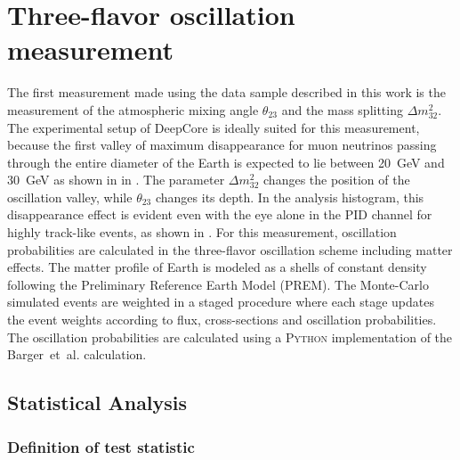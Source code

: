 \chapter{Three-flavor oscillation measurement}
\setchapterpreamble[u]{\margintoc}

The first measurement made using the data sample described in this work is the measurement of the atmospheric mixing angle $\theta_{23}$ and the mass splitting $\Delta m^2_{32}$. The experimental setup of DeepCore is ideally suited for this measurement, because the first valley of maximum disappearance for muon neutrinos passing through the entire diameter of the Earth is expected to lie between 20~GeV and 30~GeV as shown in  in . The parameter $\Delta m^2_{32}$ changes the position of the oscillation valley, while $\theta_{23}$ changes its depth. In the analysis histogram, this disappearance effect is evident even with the eye alone in the PID channel for highly track-like events, as shown in . For this measurement, oscillation probabilities are calculated in the three-flavor oscillation scheme including matter effects. The matter profile of Earth is modeled as a shells of constant density following the Preliminary Reference Earth Model (PREM). The Monte-Carlo simulated events are weighted in a staged procedure where each stage updates the event weights according to flux, cross-sections and oscillation probabilities. The oscillation probabilities are calculated using a \textsc{Python} implementation of the Barger~et~al. calculation.

%    

\section{Statistical Analysis}

\subsection{Definition of test statistic}
\label{sec:test-statistic}

